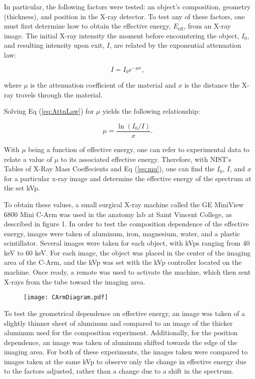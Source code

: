 In particular, the following factors were tested: an object's composition, geometry (thickness), and position in the X-ray detector. To test any of these factors, one must first determine how to obtain the effective energy, $E_{\text{eff}}$, from an X-ray image. The initial X-ray intensity the moment before encountering the object, $I_0$, and resulting intensity upon exit, $I$, are related by the exponential attenuation law:

\begin{equation}
    I = I_0e^{-\mu x},
\label{eq:AttnLaw}
\end{equation}

where $\mu$ is the attenuation coefficient of the material and $x$ is the distance the X-ray travels through the material.

Solving Eq (\ref{eq:AttnLaw}) for $\mu$ yields the following relationship:

\begin{equation}
    \mu = \frac{\ln{(I_0/I)}}{x}.
\label{eq:mu}
\end{equation}

With $\mu$ being a function of effective energy, one can refer to experimental data to relate a value of $\mu$ to its associated effective energy. Therefore, with NIST's Tables of X-Ray Mass Coeffecients \cite{NIST} and Eq (\ref{eq:mu}), one can find the $I_0$, $I$, and $x$ for a particular x-ray image and determine the effective energy of the spectrum at the set kVp.

To obtain these values, a small surgical X-ray machine called the GE MiniView 6800 Mini C-Arm was used in the anatomy lab at Saint Vincent College, as described in figure 1. In order to test the composition dependence of the effective energy, images were taken of aluminum, iron, magnesium, water, and a plastic scintillator. Several images were taken for each object, with kVps ranging from 40 keV to 60 keV. For each image, the object was placed in the center of the imaging area of the C-Arm, and the kVp was set with the kVp controller located on the machine. Once ready, a remote was used to activate the machine, which then sent X-rays from the tube toward the imaging area.

\begin{figure}[H]
    \centering
	\texttt{[image: CArmDiagram.pdf]}
	\label{figure:CArmDiagram}
	\caption{}
\end{figure}

To test the geometrical dependence on effective energy, an image was taken of a slightly thinner sheet of aluminum and compared to an image of the thicker aluminum used for the composition experiment. Additionally, for the position dependence, an image was taken of aluminum shifted towards the edge of the imaging area. For both of these experiments, the images taken were compared to images taken at the same kVp to observe only the change in effective energy due to the factors adjusted, rather than a change due to a shift in the spectrum.

